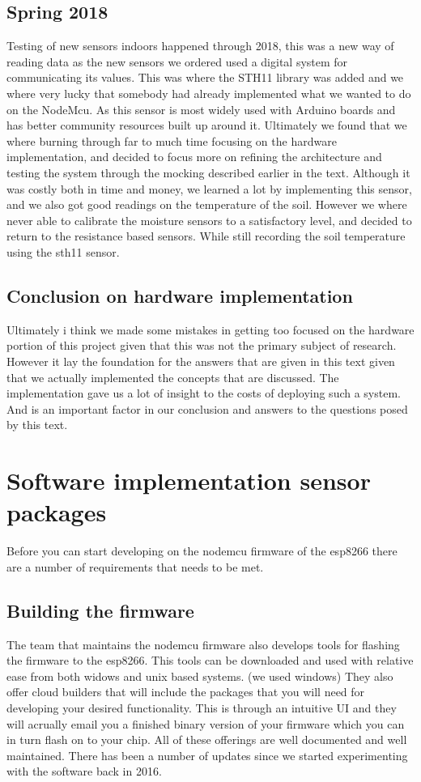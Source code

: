 \documentclass[]{uiophd}
\begin{document}
\subsection{Spring 2018}
Testing of new sensors indoors happened through 2018, this was a new way of reading data as the new sensors we ordered used a digital system for communicating its values. This was where the STH11 library was added and we where very lucky that somebody had already implemented what we wanted to do on the NodeMcu. As this sensor is most widely used with Arduino boards and has better community resources built up around it. Ultimately we found that we where burning through far to much time focusing on the hardware implementation, and decided to focus more on refining the architecture and testing the system through the mocking described earlier in the text. Although it was costly both in time and money, we learned a lot by implementing this sensor, and we also got good readings on the temperature of the soil. However we where never able to calibrate the moisture sensors to a satisfactory level, and decided to return to the resistance based sensors. While still recording the soil temperature using the sth11 sensor. 
\subsection{Conclusion on hardware implementation}
Ultimately i think we made some mistakes in getting too focused on the hardware portion of this project given that this was not the primary subject of research. However it lay the foundation for the answers that are given in this text given that we actually implemented the concepts that are discussed. The implementation gave us a lot of insight to the costs of deploying such a system. And is an important factor in our conclusion and answers to the questions posed by this text.
\section{Software implementation sensor packages}
Before you can start developing on the nodemcu firmware of the esp8266 there are a number of requirements that needs to be met.
\subsection{Building the firmware}
The team that maintains the nodemcu firmware also develops tools for flashing the firmware to the esp8266. This tools can be downloaded and used with relative ease from both widows and unix based systems. (we used windows) They also offer cloud builders that will include the packages that you will need for developing your desired functionality. This is through an intuitive UI and they will acrually email you a finished binary version of your firmware which you can in turn flash on to your chip. All of these offerings are well documented and well maintained. There has been a number of updates since we started experimenting with the software back in 2016.
\end{document}
